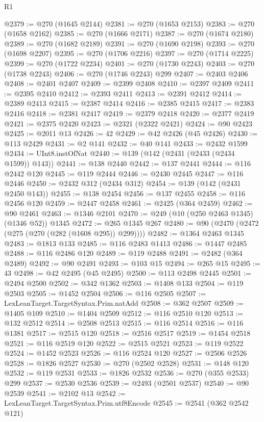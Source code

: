 \begin{lexlean}{R1}
\begin{coremodule}
@2379 := @270 (@1645 @2144)
@2381 := @270 (@1653 @2153)
@2383 := @270 (@1658 @2162)
@2385 := @270 (@1666 @2171)
@2387 := @270 (@1674 @2180)
@2389 := @270 (@1682 @2189)
@2391 := @270 (@1690 @2198)
@2393 := @270 (@1698 @2207)
@2395 := @270 (@1706 @2216)
@2397 := @270 (@1714 @2225)
@2399 := @270 (@1722 @2234)
@2401 := @270 (@1730 @2243)
@2403 := @270 (@1738 @2243)
@2406 := @270 (@1746 @2243) @299
@2407 := @2403 @2406
@2408 := @2401 @2407
@2409 := @2399 @2408
@2410 := @2397 @2409
@2411 := @2395 @2410
@2412 := @2393 @2411
@2413 := @2391 @2412
@2414 := @2389 @2413
@2415 := @2387 @2414
@2416 := @2385 @2415
@2417 := @2383 @2416
@2418 := @2381 @2417
@2419 := @2379 @2418
@2420 := @2377 @2419
@2421 := @2375 @2420
@2423 := @2321 (@2322 @2421)
@2424 := @90 @2423
@2425 := @2011 @13
@2426 := 42
@2429 := @42 @2426 (@45 @2426)
@2430 := @113 @2429
@2431 := @2 @141
@2432 := @40 @141
@2433 := @2432 @1599
@2434 := UInt8.instOfNat
@2440 := @139 (@142 (@2431 (@2433 (@2434 @1599)) @143))
@2441 := @138 @2440
@2442 := @137 @2441
@2444 := @116 @2442 @120
@2445 := @119 @2444
@2446 := @2430 @2445
@2447 := @116 @2446
@2450 := @2432 @312 (@2434 @312)
@2454 := @139 (@142 (@2431 @2450 @143))
@2455 := @138 @2454
@2456 := @137 @2455
@2458 := @116 @2456 @120
@2459 := @2447 @2458
@2461 := @2425 (@364 @2459)
@2462 := @90 @2461
@2463 := @1346 @2101
@2470 := @249 (@10 (@250 @2463 @1345) (@1346 @52)) @1345
@2472 := @265 @1345 @267
@2480 := @90 (@2470 (@2472 (@275 (@270 (@282 (@1608 @295)) @299))))
@2482 := @1364 @2463 @1345
@2483 := @1813 @133
@2485 := @116 @2483 @1413
@2486 := @1447 @2485
@2488 := @116 @2486 @120
@2489 := @119 @2488
@2491 := @2482 (@364 @2489)
@2492 := @90 @2491
@2493 := @103 @15
@2494 := @265 @15
@2495 := 43
@2498 := @42 @2495 (@45 @2495)
@2500 := @113 @2498 @2445
@2501 := @2494 @2500
@2502 := @342 @1362
@2503 := @1408 @133
@2504 := @119 @2503
@2505 := @1452 @2504
@2506 := @116 @2505
@2507 := LexLeanTarget.TargetSyntax.Prim.natAdd
@2508 := @362 @2507
@2509 := @1405 @109
@2510 := @1404 @2509
@2512 := @116 @2510 @120
@2513 := @132 @2512
@2514 := @2508 @2513
@2515 := @116 @2514
@2516 := @116 @1381
@2517 := @2515 @120
@2518 := @2516 @2517
@2519 := @1454 @2518
@2521 := @116 @2519 @120
@2522 := @2515 @2521
@2523 := @119 @2522
@2524 := @1452 @2523
@2526 := @116 @2524 @120
@2527 := @2506 @2526
@2528 := @1826 @2527
@2530 := @270 (@2502 @2528)
@2531 := @148 @120
@2532 := @119 @2531
@2533 := @1826 @2532
@2536 := @270 (@355 @2533) @299
@2537 := @2530 @2536
@2539 := @2493 (@2501 @2537)
@2540 := @90 @2539
@2541 := @2102 @13
@2542 := LexLeanTarget.TargetSyntax.Prim.utf8Encode
@2545 := @2541 (@362 @2542 @121)

\end{coremodule}
\end{lexlean}
